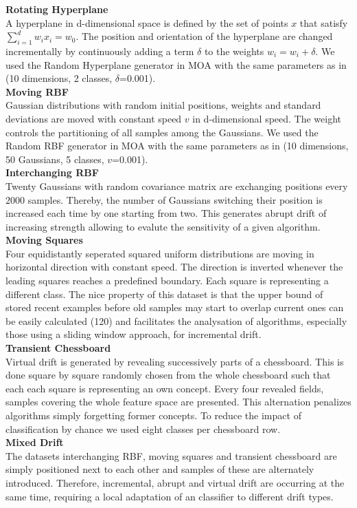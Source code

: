 \documentclass[conference]{IEEEtran}
\begin{document}
\textbf{Rotating Hyperplane}\\
A hyperplane in d-dimensional space is defined by the set of points $x$ that satisfy $\sum_{i=1}^{d}w_ix_i=w_0$. The position and orientation of the hyperplane
are changed incrementally by continuously adding a term $\delta$ to the weights $w_i=w_i+\delta$. 
We used the Random Hyperplane generator in MOA with the same parameters as in \cite{Bifet:2013:EDS:2480362.2480516} (10 dimensions, 2 classes, $\delta$=0.001).\\ 
\textbf{Moving RBF}\\
Gaussian distributions with random initial positions, weights and standard deviations are moved with constant speed $v$ in d-dimensional speed. 
The weight controls the partitioning of all samples among the Gaussians.
We used the Random RBF generator in MOA with the same parameters as in \cite{Bifet:2013:EDS:2480362.2480516} (10 dimensions, 50 Gaussians, 5 classes, $v$=0.001).\\ 
\textbf{Interchanging RBF}\\
Twenty Gaussians with random covariance matrix are exchanging positions every $2000$ samples. Thereby, the number of Gaussians switching their position is increased each time by one
starting from two. This generates abrupt drift of increasing strength allowing to evalute the sensitivity of a given algorithm.\\ 
\textbf{Moving Squares}\\
Four equidistantly seperated squared uniform distributions are moving in horizontal direction with constant speed. The direction is inverted whenever the leading squares reaches a predefined boundary.
Each square is representing a different class. 
The nice property of this dataset is that the upper bound of stored recent examples before old samples may start to  overlap current ones can be easily calculated (120) and  
facilitates the analysation of algorithms, especially those using a sliding window approach, for incremental drift.\\
\textbf{Transient Chessboard}\\
Virtual drift is generated by revealing successively parts of a chessboard. This is done square by square randomly chosen from the whole chessboard such that each 
each square is representing an own concept. Every four revealed fields, samples covering the whole feature space are presented. 
This alternation penalizes algorithms simply forgetting former concepts. To reduce the impact of classification by chance we used eight classes per chessboard row.\\ 
\textbf{Mixed Drift} \\
The datasets interchanging RBF, moving squares and transient chessboard are simply positioned next to each other and samples of these are alternately introduced.
Therefore, incremental, abrupt and virtual drift are occurring at the same time, requiring a local adaptation of an classifier to different drift types.\\
\end{document}
